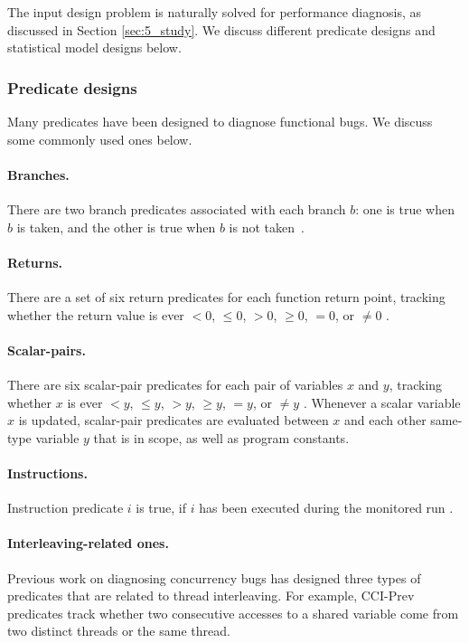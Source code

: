 The input design problem is naturally solved for performance diagnosis, as
discussed in Section \ref{sec:5_study}. We discuss different predicate designs
and statistical model designs below.

\subsubsection{Predicate designs}
Many predicates have been designed to diagnose functional bugs.
We discuss some commonly used ones below.

\paragraph{Branches.} There are two branch 
predicates associated
with each branch $b$: one is true when $b$ is taken, and the other is true when
$b$ is not taken~\citep{liblit03,liblit05}.

\paragraph{Returns.} There are a set of six return predicates
for each function return point, tracking whether the return value is ever
$<0$, $\leq 0$, $>0$, $\geq 0$, $=0$, or $\neq 0$ \citep{liblit03,liblit05}.

\paragraph{Scalar-pairs.} There are six scalar-pair predicates
for each pair of variables $x$ and $y$, tracking whether $x$ is ever 
$<y$, $\leq y$, $>y$, $\geq y$, $=y$, or $\neq y$ \citep{liblit03,liblit05}.
Whenever a scalar
variable $x$ is updated, scalar-pair predicates are evaluated between $x$ and
each other same-type variable $y$ that is in scope, as well as program 
constants.

\paragraph{Instructions.} Instruction predicate $i$ is true, if 
$i$ has been executed during the monitored run 
\citep{tarantula1,tarantula2,tarantula.darko}.

\paragraph{Interleaving-related ones.} Previous work on diagnosing
concurrency bugs \citep{CCI} has designed three types of predicates that are 
related to
thread interleaving. For example, CCI-Prev predicates track whether two 
consecutive accesses to a
shared variable come from two distinct threads or the same thread.

